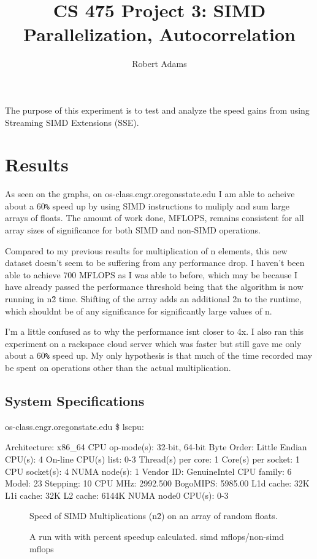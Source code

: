 \documentclass[letterpaper,10pt]{article} %
\begin{document}
\title{CS 475 Project 3: SIMD Parallelization, Autocorrelation } 
\author{Robert Adams}
\maketitle


The purpose of this experiment is to test and analyze the speed
gains from using Streaming SIMD Extensions (SSE).


\section{Results}


As seen on the graphs, on os-class.engr.oregonsstate.edu I am able to 
acheive about a 60\verb|%| speed up by using SIMD instructions to muliply
and sum large arrays of floats. The amount of work done, MFLOPS, remains
consistent for all array sizes of significance for both SIMD and non-SIMD operations. 


	Compared to my previous results for multiplication of n elements, this new dataset
  doesn't seem to be suffering from any performance drop. I haven't been able to
  achieve 700 MFLOPS as I was able to before, which may be because I have already 
  passed the performance threshold being that the algorithm is now running in
  n\^2 time. Shifting of the array adds an additional 2n to the runtime, which
  shouldnt be of any significance for significantly large values of n.

  
  I’m a little confused as to why the performance isnt closer to 4x. 
  I also ran this experiment on a rackspace cloud server which was faster but 
  still gave me only about a 60\verb|%| speed up. My only hypothesis is that much of 
  the time recorded may be spent on operations other than the actual
  multiplication.
  
  
  \subsection{System Specifications}

os-class.engr.oregonstate.edu \$ lscpu:

Architecture:          x86\_64
CPU op-mode(s):        32-bit, 64-bit
Byte Order:            Little Endian
CPU(s):                4
On-line CPU(s) list:   0-3
Thread(s) per core:    1
Core(s) per socket:    1
CPU socket(s):         4
NUMA node(s):          1
Vendor ID:             GenuineIntel
CPU family:            6
Model:                 23
Stepping:              10
CPU MHz:               2992.500
BogoMIPS:              5985.00
L1d cache:             32K
L1i cache:             32K
L2 cache:              6144K
NUMA node0 CPU(s):     0-3


\begin{figure} [ht]
    \centering
    
\caption{Speed of SIMD Multiplications (n\^2) on an array of random floats.}
    \label{runtimes}
\end{figure}

\begin{figure} [ht]
    \centering
    
    \caption{A run with with percent speedup calculated. simd mflops/non-simd mflops} 
    \label{runtimes}
\end{figure}
\end{document}
